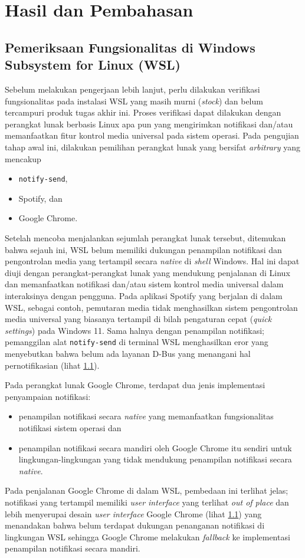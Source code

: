 \chapter{Hasil dan Pembahasan}

\section{Pemeriksaan Fungsionalitas di Windows Subsystem for Linux (WSL)}

Sebelum melakukan pengerjaan lebih lanjut, perlu dilakukan verifikasi fungsionalitas pada instalasi WSL yang masih murni (\textit{stock}) dan belum tercampuri produk tugas akhir ini. Proses verifikasi dapat dilakukan dengan perangkat lunak berbasis Linux apa pun yang mengirimkan notifikasi dan/atau memanfaatkan fitur kontrol media universal pada sistem operasi. Pada pengujian tahap awal ini, dilakukan pemilihan perangkat lunak yang bersifat \textit{arbitrary} yang mencakup
\begin{itemize}
    \item \verb|notify-send|,
    \item Spotify, dan
    \item Google Chrome.
\end{itemize}

Setelah mencoba menjalankan sejumlah perangkat lunak tersebut, ditemukan bahwa sejauh ini, WSL belum memiliki dukungan penampilan notifikasi dan pengontrolan media yang tertampil secara \textit{native} di \textit{shell} Windows. Hal ini dapat diuji dengan perangkat-perangkat lunak yang mendukung penjalanan di Linux dan memanfaatkan notifikasi dan/atau sistem kontrol media universal dalam interaksinya dengan pengguna. Pada aplikasi Spotify yang berjalan di dalam WSL, sebagai contoh, pemutaran media tidak menghasilkan sistem pengontrolan media universal yang biasanya tertampil di bilah pengaturan cepat (\textit{quick settings}) pada Windows 11. Sama halnya dengan penampilan notifikasi; pemanggilan alat \verb|notify-send| di terminal WSL menghasilkan eror yang menyebutkan bahwa belum ada layanan D-Bus yang menangani hal pernotifikasian (lihat \ref{}).

Pada perangkat lunak Google Chrome, terdapat dua jenis implementasi penyampaian notifikasi:
\begin{itemize}
    \item penampilan notifikasi secara \textit{native} yang memanfaatkan fungsionalitas notifikasi sistem operasi dan
    \item penampilan notifikasi secara mandiri oleh Google Chrome itu sendiri untuk lingkungan-lingkungan yang tidak mendukung penampilan notifikasi secara \textit{native}.
\end{itemize}
Pada penjalanan Google Chrome di dalam WSL, pembedaan ini terlihat jelas; notifikasi yang tertampil memiliki \textit{user interface} yang terlihat \textit{out of place} dan lebih menyerupai desain \textit{user interface} Google Chrome (lihat \ref{}) yang menandakan bahwa belum terdapat dukungan penanganan notifikasi di lingkungan WSL sehingga Google Chrome melakukan \textit{fallback} ke implementasi penampilan notifikasi secara mandiri.

